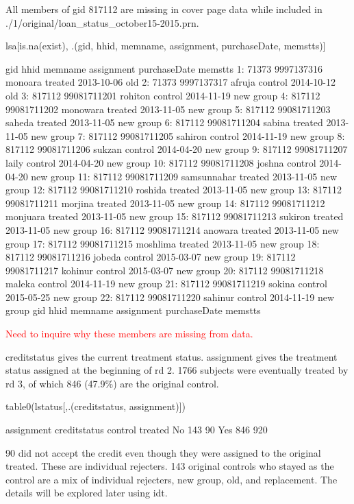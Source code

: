 All members of \textsf{gid} 817112 are missing in cover page data while included in \textsf{\footnotesize./1/original/loan\_status\_october15-2015.prn}.
\begin{Schunk}
\begin{Sinput}
lsa[is.na(exist), .(gid, hhid, memname, assignment, purchaseDate, memstts)]
\end{Sinput}
\begin{Soutput}
       gid        hhid     memname assignment purchaseDate   memstts
 1:  71373  9997137316     monoara    treated   2013-10-06       old
 2:  71373  9997137317      afruja    control   2014-10-12       old
 3: 817112 99081711201     rohiton    control   2014-11-19 new group
 4: 817112 99081711202    monowara    treated   2013-11-05 new group
 5: 817112 99081711203      saheda    treated   2013-11-05 new group
 6: 817112 99081711204      sabina    treated   2013-11-05 new group
 7: 817112 99081711205     sahiron    control   2014-11-19 new group
 8: 817112 99081711206      sukzan    control   2014-04-20 new group
 9: 817112 99081711207       laily    control   2014-04-20 new group
10: 817112 99081711208      joshna    control   2014-04-20 new group
11: 817112 99081711209 samsunnahar    treated   2013-11-05 new group
12: 817112 99081711210     roshida    treated   2013-11-05 new group
13: 817112 99081711211     morjina    treated   2013-11-05 new group
14: 817112 99081711212    monjuara    treated   2013-11-05 new group
15: 817112 99081711213     sukiron    treated   2013-11-05 new group
16: 817112 99081711214     anowara    treated   2013-11-05 new group
17: 817112 99081711215    moshlima    treated   2013-11-05 new group
18: 817112 99081711216      jobeda    control   2015-03-07 new group
19: 817112 99081711217     kohinur    control   2015-03-07 new group
20: 817112 99081711218      maleka    control   2014-11-19 new group
21: 817112 99081711219      sokina    control   2015-05-25 new group
22: 817112 99081711220     sahinur    control   2014-11-19 new group
       gid        hhid     memname assignment purchaseDate   memstts
\end{Soutput}
\end{Schunk}
\textcolor{red}{Need to inquire why these members are missing from data.}

\textsf{creditstatus} gives the current treatment status. \textsf{assignment} gives the treatment status assigned at the beginning of rd 2. 1766 subjects were eventually treated by rd 3, of which 846 (47.9\%) are the original control.
\begin{Schunk}
\begin{Sinput}
table0(lstatus[,.(creditstatus, assignment)])
\end{Sinput}
\begin{Soutput}
            assignment
creditstatus control treated
         No      143      90
         Yes     846     920
\end{Soutput}
\end{Schunk}
90 did not accept the credit even though they were assigned to the original treated. These are individual rejecters. 143 original controls who stayed as the control are a mix of individual rejecters, new group, old, and replacement. The details will be explored later using \textsf{idt}.

